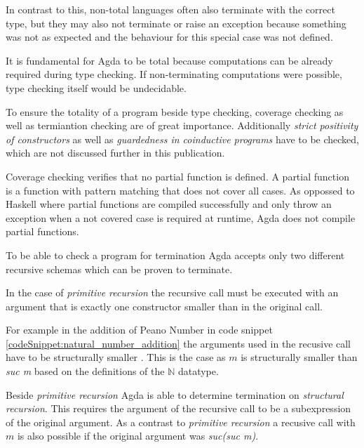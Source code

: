 In contrast to this, non-total languages often also terminate with the correct type, but they may also not terminate or raise an exception because something was not as expected and the behaviour for this special case was not defined.

It is fundamental for Agda to be total because computations can be already required during type checking.
If non-terminating computations were possible, type checking itself would be undecidable\cite{agda_wiki_totality}.

To ensure the totality of a program beside type checking, coverage checking as well as termiantion checking are of great importance. 
Additionally \emph{strict positivity of constructors} as well as \emph{guardedness in coinductive programs} have to be checked, which are not discussed further in this publication.

Coverage checking verifies that no partial function is defined. A partial function is a function with pattern matching that does not cover all cases.
As oppossed to Haskell where partial functions are compiled successfully and only throw an exception when a not covered case is required at runtime, Agda does not compile partial functions.

To be able to check a program for termination Agda accepts only two different recursive schemas which can be proven to terminate.

In the case of \emph{primitive recursion} the recursive call must be executed with an argument that is exactly one constructor smaller than in the original call.

For example in the addition of Peano Number in code snippet \ref{codeSnippet:natural_number_addition} the arguments used in the recusive call have to be structurally smaller \cite{norell:deptyped}. 
This is the case as $m$ is structurally smaller than \emph{suc m} based on the definitions of the $\mathbb{N}$ datatype.

Beside \emph{primitive recursion} Agda is able to determine termination on \emph{structural recursion}.
This requires the argument of the recursive call to be a subexpression of the original argument.
As a contrast to \emph{primitive recursion} a recusive call with $m$ is also possible if the original argument was \emph{suc(suc m)}.